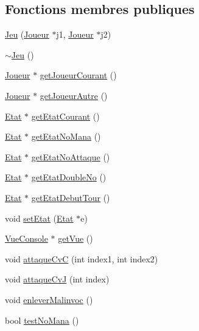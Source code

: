 \subsection*{Fonctions membres publiques}
\begin{DoxyCompactItemize}
\item 
\hyperlink{class_jeu_a3033d02a2ec0e17b170b0735393d716e}{Jeu} (\hyperlink{class_joueur}{Joueur} $\ast$j1, \hyperlink{class_joueur}{Joueur} $\ast$j2)
\item 
\hyperlink{class_jeu_a9cd19e73df169d7f09397be61ba8548c}{$\sim$\-Jeu} ()
\item 
\hyperlink{class_joueur}{Joueur} $\ast$ \hyperlink{class_jeu_a676f11e6bda0cde27f128e90cbaae765}{get\-Joueur\-Courant} ()
\item 
\hyperlink{class_joueur}{Joueur} $\ast$ \hyperlink{class_jeu_aeaa0f199d6a1c9271a49b226159dd1ca}{get\-Joueur\-Autre} ()
\item 
\hyperlink{class_etat}{Etat} $\ast$ \hyperlink{class_jeu_a6a84bec16f8075c1c9b867096dfc2b06}{get\-Etat\-Courant} ()
\item 
\hyperlink{class_etat}{Etat} $\ast$ \hyperlink{class_jeu_a6af6b2d0bd215cde1d63dbe3e799b291}{get\-Etat\-No\-Mana} ()
\item 
\hyperlink{class_etat}{Etat} $\ast$ \hyperlink{class_jeu_a4935a721a0e230cebae3905c78f3721f}{get\-Etat\-No\-Attaque} ()
\item 
\hyperlink{class_etat}{Etat} $\ast$ \hyperlink{class_jeu_a94fc4b05a1d532795b4c8a5d0fec4003}{get\-Etat\-Double\-No} ()
\item 
\hyperlink{class_etat}{Etat} $\ast$ \hyperlink{class_jeu_a8ae205a6a9d95ec5bed20e2fdf5c74a7}{get\-Etat\-Debut\-Tour} ()
\item 
void \hyperlink{class_jeu_a0e5e13b72cd123ac0afef1fa001c9d5f}{set\-Etat} (\hyperlink{class_etat}{Etat} $\ast$e)
\item 
\hyperlink{class_vue_console}{Vue\-Console} $\ast$ \hyperlink{class_jeu_a2f39c9ab947721e35f78a0e187722ce6}{get\-Vue} ()
\item 
void \hyperlink{class_jeu_a86087ecade936bff6bad82eb024ba6bf}{attaque\-Cv\-C} (int index1, int index2)
\item 
void \hyperlink{class_jeu_a81b8b7bc79f9df1b1f3c557e04e8c634}{attaque\-Cv\-J} (int index)
\item 
void \hyperlink{class_jeu_a43c11cf6d659b78dd957cfa65d6d5547}{enlever\-Malinvoc} ()
\item 
bool \hyperlink{class_jeu_abbbc59a98fe8296456ddc112faa2b66b}{test\-No\-Mana} ()

\end{DoxyCompactItemize}
